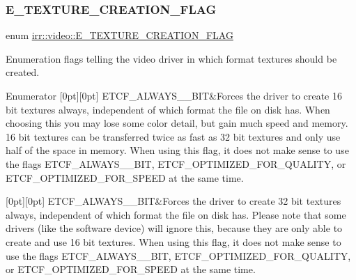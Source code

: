 \subsubsection{\texorpdfstring{E\+\_\+\+T\+E\+X\+T\+U\+R\+E\+\_\+\+C\+R\+E\+A\+T\+I\+O\+N\+\_\+\+F\+L\+AG}{E\_TEXTURE\_CREATION\_FLAG}\hspace{0.1cm}{\footnotesize\ttfamily [2/2]}}
{\footnotesize\ttfamily enum \hyperlink{namespaceirr_1_1video_acaf6f7414534f7d62bff18c5bf11876f}{irr\+::video\+::\+E\+\_\+\+T\+E\+X\+T\+U\+R\+E\+\_\+\+C\+R\+E\+A\+T\+I\+O\+N\+\_\+\+F\+L\+AG}}



Enumeration flags telling the video driver in which format textures should be created. 

\begin{DoxyEnumFields}{Enumerator}
[0pt][0pt]{}\mbox{\label{namespaceirr_1_1video_acaf6f7414534f7d62bff18c5bf11876fabecb9e1d0b012d6393809a80e0041bf8}} 
E\+T\+C\+F\+\_\+\+A\+L\+W\+A\+Y\+S\+\_\+\_\+\+B\+IT&Forces the driver to create 16 bit textures always, independent of which format the file on disk has. When choosing this you may lose some color detail, but gain much speed and memory. 16 bit textures can be transferred twice as fast as 32 bit textures and only use half of the space in memory. When using this flag, it does not make sense to use the flags E\+T\+C\+F\+\_\+\+A\+L\+W\+A\+Y\+S\+\_\+\_\+\+B\+IT, E\+T\+C\+F\+\_\+\+O\+P\+T\+I\+M\+I\+Z\+E\+D\+\_\+\+F\+O\+R\+\_\+\+Q\+U\+A\+L\+I\+TY, or E\+T\+C\+F\+\_\+\+O\+P\+T\+I\+M\+I\+Z\+E\+D\+\_\+\+F\+O\+R\+\_\+\+S\+P\+E\+ED at the same time. \\
\hline

[0pt][0pt]{}\mbox{\label{namespaceirr_1_1video_acaf6f7414534f7d62bff18c5bf11876fadc16ca39b451f846d5611ac2b213620a}} 
E\+T\+C\+F\+\_\+\+A\+L\+W\+A\+Y\+S\+\_\+\_\+\+B\+IT&Forces the driver to create 32 bit textures always, independent of which format the file on disk has. Please note that some drivers (like the software device) will ignore this, because they are only able to create and use 16 bit textures. When using this flag, it does not make sense to use the flags E\+T\+C\+F\+\_\+\+A\+L\+W\+A\+Y\+S\+\_\+\_\+\+B\+IT, E\+T\+C\+F\+\_\+\+O\+P\+T\+I\+M\+I\+Z\+E\+D\+\_\+\+F\+O\+R\+\_\+\+Q\+U\+A\+L\+I\+TY, or E\+T\+C\+F\+\_\+\+O\+P\+T\+I\+M\+I\+Z\+E\+D\+\_\+\+F\+O\+R\+\_\+\+S\+P\+E\+ED at the same time. \\
\hline


\end{DoxyEnumFields}
